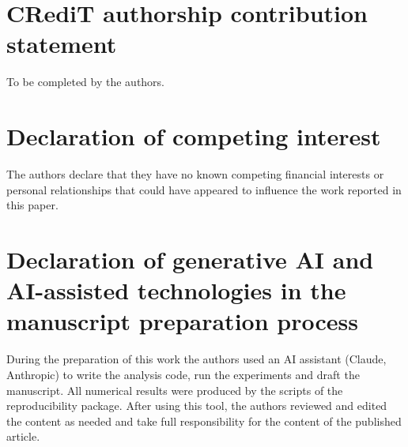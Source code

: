 \documentclass[preprint,12pt]{elsarticle}
\begin{document}
\section*{CRediT authorship contribution statement}
To be completed by the authors.

\section*{Declaration of competing interest}
The authors declare that they have no known competing financial interests or personal relationships that could have appeared to influence the work reported in this paper.

\section*{Declaration of generative AI and AI-assisted technologies in the manuscript preparation process}
During the preparation of this work the authors used an AI assistant (Claude, Anthropic) to write the analysis code, run the experiments and draft the manuscript. All numerical results were produced by the scripts of the reproducibility package. After using this tool, the authors reviewed and edited the content as needed and take full responsibility for the content of the published article.





\end{document}
